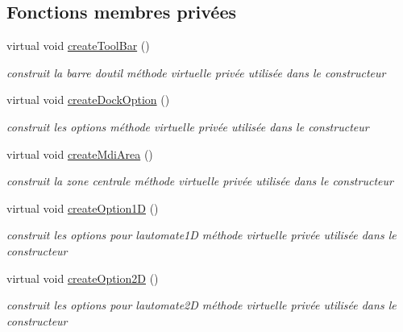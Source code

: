 \subsection*{Fonctions membres privées}
\begin{DoxyCompactItemize}
\item 
virtual void \hyperlink{class_main_window_aeb57235ebc08860e680132db167c09b4}{create\+Tool\+Bar} ()
\begin{DoxyCompactList}\small\item\em construit la barre d\textquotesingle{}outil méthode virtuelle privée utilisée dans le constructeur \end{DoxyCompactList}\item 
virtual void \hyperlink{class_main_window_a57d11300ed1f37447626810acbcfd6c4}{create\+Dock\+Option} ()
\begin{DoxyCompactList}\small\item\em construit les options méthode virtuelle privée utilisée dans le constructeur \end{DoxyCompactList}\item 
virtual void \hyperlink{class_main_window_a6de156fdb121e0c7f7b940eca3633087}{create\+Mdi\+Area} ()
\begin{DoxyCompactList}\small\item\em construit la zone centrale méthode virtuelle privée utilisée dans le constructeur \end{DoxyCompactList}\item 
virtual void \hyperlink{class_main_window_a8ab1b6ec65be939f3f3927e2fff93756}{create\+Option1D} ()
\begin{DoxyCompactList}\small\item\em construit les options pour l\textquotesingle{}automate1D méthode virtuelle privée utilisée dans le constructeur \end{DoxyCompactList}\item 
virtual void \hyperlink{class_main_window_a45eb73f1c5f7a104c6bb7d14c281435c}{create\+Option2D} ()
\begin{DoxyCompactList}\small\item\em construit les options pour l\textquotesingle{}automate2D méthode virtuelle privée utilisée dans le constructeur \end{DoxyCompactList}\end{DoxyCompactItemize}
